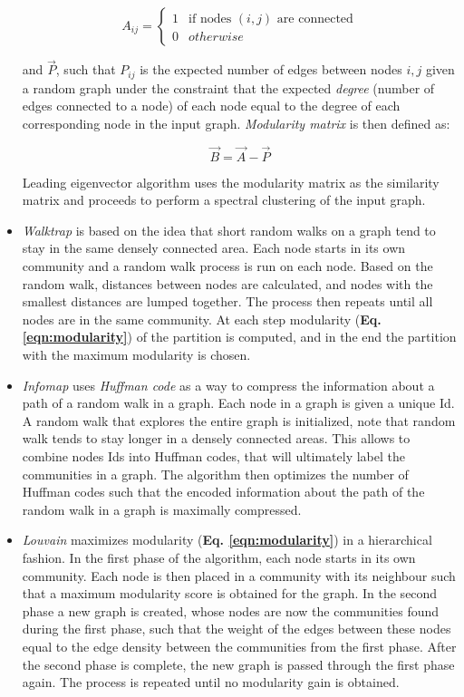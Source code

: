 \begin{itemize}
\begin{equation}
\label{eqn:adj_matrix}
A_{ij}=
\begin{cases}
	1 & \text{if nodes $(i,j)$ are connected}\\
	0 & otherwise
\end{cases}
\end{equation}

and $\vec{P}$, such that $P_{ij}$ is the expected number of edges between nodes $i,j$ given a random graph under the constraint that the expected \textit{degree} (number of edges connected to a node) of each node equal to the degree of each corresponding node in the input graph. \textit{Modularity matrix} is then defined as:

\begin{equation}
\label{eqn:modularity_matrix}
\vec{B}=\vec{A}-\vec{P}
\end{equation}

Leading eigenvector algorithm uses the modularity matrix as the similarity matrix and proceeds to perform a spectral clustering of the input graph.

\item \textit{Walktrap}\cite{Pons_2006} is based on the idea that short random walks on a graph tend to stay in the same densely connected area. Each node starts in its own community and a random walk process is run on each node. Based on the random walk, distances between nodes are calculated, and nodes with the smallest distances are lumped together. The process then repeats until all nodes are in the same community. At each step modularity (\textbf{Eq. \eqref{eqn:modularity}}) of the partition is computed, and in the end the partition with the maximum modularity is chosen.

\item \textit{Infomap}\cite{Rosvall_2009} uses \textit{Huffman code} as a way to compress the information about a path of a random walk in a graph.
Each node in a graph is given a unique Id. A random walk that explores the entire graph is initialized, note that random walk tends to stay longer in a densely connected areas. This allows to combine nodes Ids into Huffman codes, that will ultimately label the communities in a graph. The algorithm then optimizes the number of Huffman codes such that the encoded information about the path of the random walk in a graph is maximally compressed.

\item \textit{Louvain}\cite{Blondel_2008} maximizes modularity (\textbf{Eq. \eqref{eqn:modularity}}) in a hierarchical fashion. In the first phase of the algorithm, each node starts in its own community. Each node is then placed in a community with its neighbour such that a maximum modularity score is obtained for the graph. In the second phase a new graph is created, whose nodes are now the communities found during the first phase, such that the weight of the edges between these nodes equal to the edge density between the communities from the first phase. After the second phase is complete, the new graph is passed through the first phase again. The process is repeated until no modularity gain is obtained.


\end{itemize}
